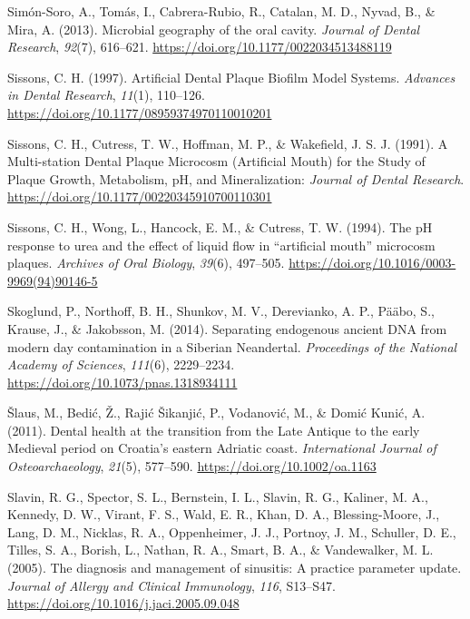 \documentclass[
  letterpaper,
]{book}
\newlength{\cslhangindent}
\newlength{\cslentryspacingunit} %
\newenvironment{CSLReferences}[2] %
 {%
  \setlength{\parindent}{0pt}
  \ifodd #1
  \let\oldpar\par
  \def\par{\hangindent=\cslhangindent\oldpar}
  \fi
  \setlength{\parskip}{#2\cslentryspacingunit}
 }%
 {}
\begin{document}
\begin{CSLReferences}{1}{0}
\leavevmode{}%
Simón-Soro, A., Tomás, I., Cabrera-Rubio, R., Catalan, M. D., Nyvad, B.,
\& Mira, A. (2013). Microbial geography of the oral cavity.
\emph{Journal of Dental Research}, \emph{92}(7), 616--621.
\url{https://doi.org/10.1177/0022034513488119}

\leavevmode{}%
Sissons, C. H. (1997). Artificial {Dental Plaque Biofilm Model Systems}.
\emph{Advances in Dental Research}, \emph{11}(1), 110--126.
\url{https://doi.org/10.1177/08959374970110010201}

\leavevmode{}%
Sissons, C. H., Cutress, T. W., Hoffman, M. P., \& Wakefield, J. S. J.
(1991). A {Multi-station Dental Plaque Microcosm} ({Artificial Mouth})
for the {Study} of {Plaque Growth}, {Metabolism}, {pH}, and
{Mineralization}: \emph{Journal of Dental Research}.
\url{https://doi.org/10.1177/00220345910700110301}

\leavevmode{}%
Sissons, C. H., Wong, L., Hancock, E. M., \& Cutress, T. W. (1994). The
{pH} response to urea and the effect of liquid flow in {``artificial
mouth''} microcosm plaques. \emph{Archives of Oral Biology},
\emph{39}(6), 497--505.
\url{https://doi.org/10.1016/0003-9969(94)90146-5}

\leavevmode{}%
Skoglund, P., Northoff, B. H., Shunkov, M. V., Derevianko, A. P., Pääbo,
S., Krause, J., \& Jakobsson, M. (2014). Separating endogenous ancient
{DNA} from modern day contamination in a {Siberian Neandertal}.
\emph{Proceedings of the National Academy of Sciences}, \emph{111}(6),
2229--2234. \url{https://doi.org/10.1073/pnas.1318934111}

\leavevmode{}%
Šlaus, M., Bedić, Ž., Rajić Šikanjić, P., Vodanović, M., \& Domić Kunić,
A. (2011). Dental health at the transition from the {Late Antique} to
the early {Medieval} period on {Croatia}'s eastern {Adriatic} coast.
\emph{International Journal of Osteoarchaeology}, \emph{21}(5),
577--590. \url{https://doi.org/10.1002/oa.1163}

\leavevmode{}%
Slavin, R. G., Spector, S. L., Bernstein, I. L., Slavin, R. G., Kaliner,
M. A., Kennedy, D. W., Virant, F. S., Wald, E. R., Khan, D. A.,
Blessing-Moore, J., Lang, D. M., Nicklas, R. A., Oppenheimer, J. J.,
Portnoy, J. M., Schuller, D. E., Tilles, S. A., Borish, L., Nathan, R.
A., Smart, B. A., \& Vandewalker, M. L. (2005). The diagnosis and
management of sinusitis: {A} practice parameter update. \emph{Journal of
Allergy and Clinical Immunology}, \emph{116}, S13--S47.
\url{https://doi.org/10.1016/j.jaci.2005.09.048}


\end{CSLReferences}
\end{document}
